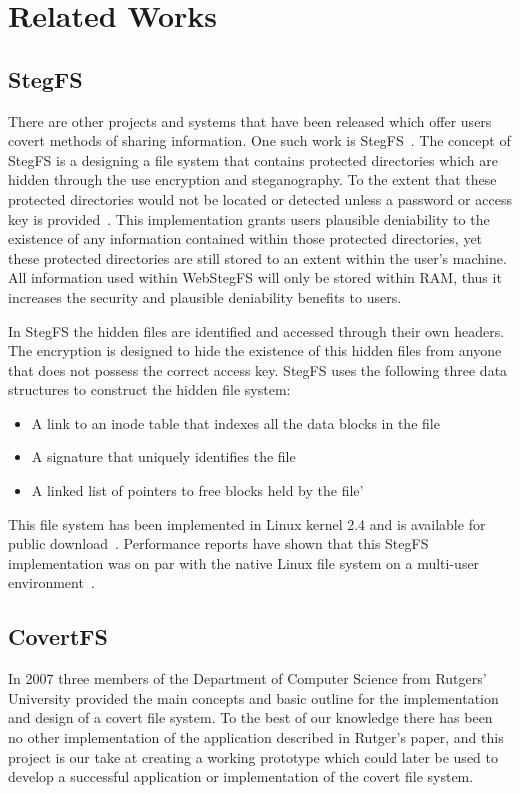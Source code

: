 \documentclass[12pt,journal,compsoc]{IEEEtran}
\begin{document}
\section{Related Works}

\subsection{StegFS}
There are other projects and systems that have been released which offer users covert methods of sharing information. One such work is StegFS~\cite{Tan2003}.  The concept of StegFS is a designing a file system that contains protected directories which are hidden through the use encryption and steganography. To the extent that these protected directories would not be located or detected unless a password or access key is provided~\cite{Tan2003}. This implementation grants users plausible deniability to the existence of any information contained within those protected directories, yet these protected directories are still stored to an extent within the user's machine. All information used within WebStegFS will only be stored within RAM, thus it increases the security and plausible deniability benefits to users.

In StegFS the hidden files are identified and accessed through their own headers. The encryption is designed to hide the existence of this hidden files from anyone that does not possess the correct access key. StegFS uses the following three data structures to construct the hidden file system: 
\begin{itemize}
\item A link to an inode table that indexes all the data blocks in the file~\cite{Tan2003}
\item A signature that uniquely identifies the file~\cite{Tan2003}
\item A linked list of pointers to free blocks held by the file'~\cite{Tan2003}
\end{itemize}

This file system has been implemented in Linux kernel 2.4 and is available for public download~\cite{Tan2003}. Performance reports have shown that this StegFS implementation was on par with the native Linux file system on a multi-user environment~\cite{2003}.


\subsection{CovertFS}
In 2007 three members of the Department of Computer Science from Rutgers' University provided the main concepts and basic outline for the implementation and design of a covert file system\cite{Baliga2007}.  To the best of our knowledge there has been no other implementation of the application described in Rutger's paper, and this project is our take at creating a working prototype which could later be used to develop a successful application or implementation of the covert file system.
\end{document}
